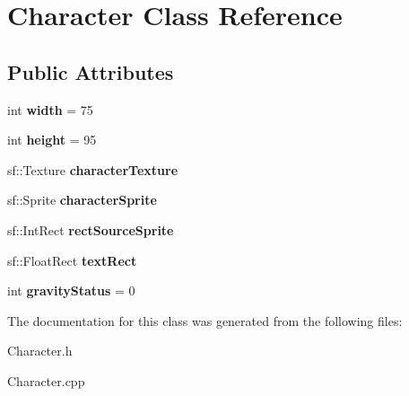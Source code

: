\hypertarget{class_character}{}\section{Character Class Reference}
\label{class_character}
\subsection*{Public Attributes}
\begin{DoxyCompactItemize}
\item 
\mbox{\label{class_character_aa945d94f4ee6ec02e5cf1fb753c94d8f}} 
int {\bfseries width} = 75
\item 
\mbox{\label{class_character_a1f7e996c91a75a5e037bebcf0bf3ac06}} 
int {\bfseries height} = 95
\item 
\mbox{\label{class_character_a3880f38149ee17393273212aba865a5e}} 
sf\+::\+Texture {\bfseries character\+Texture}
\item 
\mbox{\label{class_character_af726b53a176ba8032e3a0ad28a11868c}} 
sf\+::\+Sprite {\bfseries character\+Sprite}
\item 
\mbox{\label{class_character_a8461b99479fbc94d4b001b61f49bcafe}} 
sf\+::\+Int\+Rect {\bfseries rect\+Source\+Sprite}
\item 
\mbox{\label{class_character_ab0ce752b24dd3ac9252be132b046c917}} 
sf\+::\+Float\+Rect {\bfseries text\+Rect}
\item 
\mbox{\label{class_character_a40b71119c7b457c7fec3a90a012da631}} 
int {\bfseries gravity\+Status} = 0
\end{DoxyCompactItemize}


The documentation for this class was generated from the following files\+:\begin{DoxyCompactItemize}
\item 
Character.\+h\item 
Character.\+cpp\end{DoxyCompactItemize}
